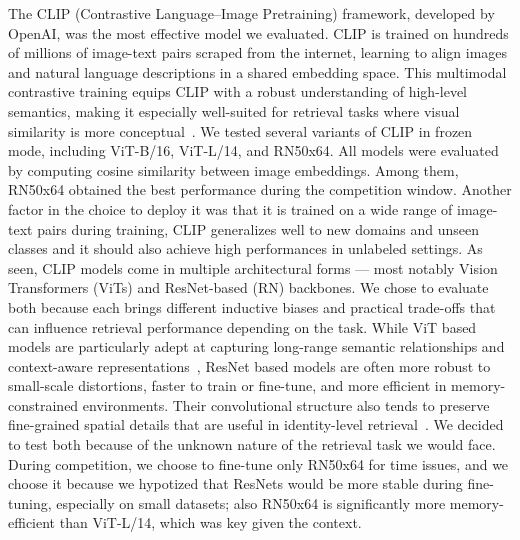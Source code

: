 The CLIP (Contrastive Language–Image Pretraining) framework, developed by OpenAI, was the most effective model we evaluated. CLIP is trained on hundreds of millions of image-text pairs scraped from the internet, learning to align images and natural language descriptions in a shared embedding space.
This multimodal contrastive training equips CLIP with a robust understanding of high-level semantics, making it especially well-suited for retrieval tasks where visual similarity is more conceptual~\cite{radford2021learning}.
We tested several variants of CLIP in frozen mode, including ViT-B/16, ViT-L/14, and RN50x64. All models were evaluated by computing cosine similarity between image embeddings. Among them, RN50x64 obtained the best performance during the competition window.
Another factor in the choice to deploy it was that it is trained on a wide range of image-text pairs during training, CLIP generalizes well to new domains and unseen classes and it should also achieve high performances in unlabeled settings.
As seen, CLIP models come in multiple architectural forms — most notably Vision Transformers (ViTs) and ResNet-based (RN) backbones. We chose to evaluate both because each brings different inductive biases and practical trade-offs that can influence retrieval performance depending on the task.
While ViT based models are particularly adept at capturing long-range semantic relationships and context-aware representations~\cite{dosovitskiy2021an}, ResNet based models are often more robust to small-scale distortions, faster to train or fine-tune, and more efficient in memory-constrained environments. Their convolutional structure also tends to preserve fine-grained spatial details that are useful in identity-level retrieval~\cite{he2016deep}.
We decided to test both because of the unknown nature of the retrieval task we would face.
During competition, we choose to fine-tune only RN50x64 for time issues, and we choose it because we hypotized that ResNets would be more stable during fine-tuning, especially on small datasets; also RN50x64 is significantly more memory-efficient than ViT-L/14, which was key given the context.


